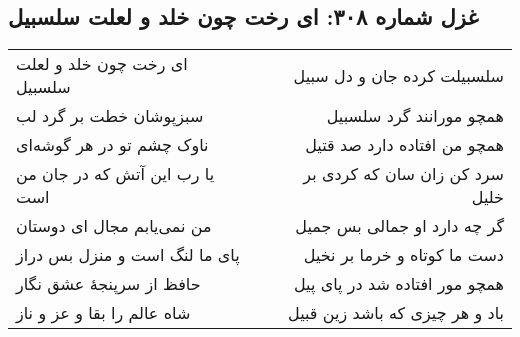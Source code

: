 \begin{center}
\section*{غزل شماره ۳۰۸: ای رخت چون خلد و لعلت سلسبیل}
\label{sec:sh308}
\begin{longtable}{l p{0.5cm} r}
ای رخت چون خلد و لعلت سلسبیل
&&
سلسبیلت کرده جان و دل سبیل
\\
سبزپوشان خطت بر گرد لب
&&
همچو مورانند گرد سلسبیل
\\
ناوک چشم تو در هر گوشه‌ای
&&
همچو من افتاده دارد صد قتیل
\\
یا رب این آتش که در جان من است
&&
سرد کن زان سان که کردی بر خلیل
\\
من نمی‌یابم مجال ای دوستان
&&
گر چه دارد او جمالی بس جمیل
\\
پای ما لنگ است و منزل بس دراز
&&
دست ما کوتاه و خرما بر نخیل
\\
حافظ از سرپنجهٔ عشق نگار
&&
همچو مور افتاده شد در پای پیل
\\
شاه عالم را بقا و عز و ناز
&&
باد و هر چیزی که باشد زین قبیل
\\
\end{longtable}
\end{center}
